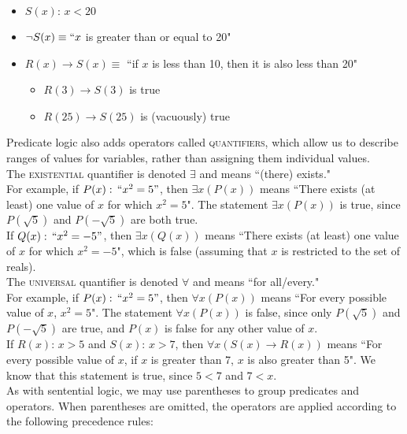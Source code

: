 \documentclass{article}
\begin{document}
\begin{itemize}
\item $S(x):\,x<20$
\item $\neg S(x)\equiv ``x$ is greater than or equal to 20"
\item $R(x)\to S(x)\equiv$ ``if $x$ is less than 10, then it is also less than 20"
	\begin{itemize}
	\item $R(3)\to S(3)$ is true
	\item $R(25)\to S(25)$ is (vacuously) true
	\end{itemize}
\end{itemize}
Predicate logic also adds operators called \textsc{quantifiers}, which allow us to describe ranges of values for variables, rather than assigning them individual values.\\[1em]
The \textsc{existential} quantifier is denoted $\exists$ and means ``(there) exists."\\[1ex]
For example, if $P(x):\,``x^2=5"$, then $\exists x(P(x))$ means ``There exists (at least) one value of $x$ for which $x^2=5$". The statement $\exists x(P(x))$ is true, since $P(\sqrt{5})$ and $P(-\sqrt{5})$ are both true.\\[1ex]
If $Q(x):\,``x^2=-5"$, then $\exists x(Q(x))$ means ``There exists (at least) one value of $x$ for which $x^2=-5$", which is false (assuming that $x$ is restricted to the set of reals).\\[1em]
The \textsc{universal} quantifier is denoted $\forall$ and means ``for all/every."\\[1ex]
For example, if $P(x):\,``x^2=5"$, then $\forall x(P(x))$ means ``For every possible value of $x$, $x^2=5$". The statement $\forall x(P(x))$ is false, since only $P(\sqrt{5})$ and $P(-\sqrt{5})$ are true, and $P(x)$ is false for any other value of $x$.\\[1ex]
If $R(x):\,x>5$ and $S(x):\,x>7$, then $\forall x(S(x)\to R(x))$ means ``For every possible value of $x$, if $x$ is greater than 7, $x$ is also greater than 5". We know that this statement is true, since $5<7$ and $7<x$.\\[1em]
As with sentential logic, we may use parentheses to group predicates and operators. When parentheses are omitted, the operators are applied according to the following precedence rules:
\begin{center}
\end{center}
\end{document}
